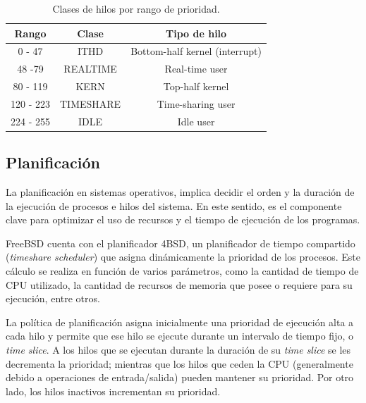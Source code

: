 \begin{table}[H]
    \centering
    \begin{tabular}{|c|c|c|}
        \hline
        \textbf{Rango} & \textbf{Clase} & \textbf{Tipo de hilo} \\
        \hline
        0 - 47 & ITHD & Bottom-half kernel (interrupt) \\
        \hline
        48 -79 & REALTIME & Real-time user \\
        \hline
        80 - 119 & KERN & Top-half kernel \\
        \hline
        120 - 223 & TIMESHARE & Time-sharing user \\
        \hline
        224 - 255 & IDLE & Idle user \\
        \hline
    \end{tabular}
    \caption{Clases de hilos por rango de prioridad.}
    \label{tabla:prio-hilos}
\end{table}


\subsection{Planificación}

La planificación en sistemas operativos, implica decidir el orden y la duración de la ejecución de procesos e hilos del sistema. En este sentido, es el componente clave para optimizar el uso de recursos y el tiempo de ejecución de los programas.\par

FreeBSD cuenta con el planificador 4BSD, un planificador de tiempo compartido (\textit{timeshare scheduler}) que asigna dinámicamente la prioridad de los procesos. Este cálculo se realiza en función de varios parámetros, como la cantidad de tiempo de CPU utilizado, la cantidad de recursos de memoria que posee o requiere para su ejecución, entre otros.\par

La política de planificación asigna inicialmente una prioridad de ejecución alta a cada hilo y permite que ese hilo se ejecute durante un intervalo de tiempo fijo, o \textit{time slice}. A los hilos que se ejecutan durante la duración de su \textit{time slice} se les decrementa la prioridad; mientras que los hilos que ceden la CPU (generalmente debido a operaciones de entrada/salida) pueden mantener su prioridad. Por otro lado, los hilos inactivos incrementan su prioridad.\par

